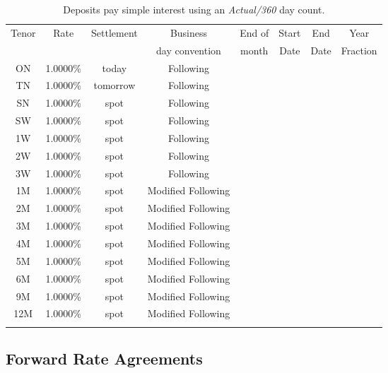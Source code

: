 \documentclass[11pt,reqno]{amsart}
\begin{document}
\begin{table}[tbp]
\label{tab:deposits}
\begin{tabular}{cccccccc}
Tenor & Rate & Settlement & Business       & End of & Start & End  & Year \\
      &      &            & day convention & month   & Date  & Date & Fraction \\
ON & 1.0000\% & today & Following &  &  \\
TN & 1.0000\% & tomorrow & Following &  &  \\
SN & 1.0000\% & spot & Following &  &  \\
SW & 1.0000\% & spot & Following &  &  \\
1W & 1.0000\% & spot & Following &  &  \\
2W & 1.0000\% & spot & Following &  &  \\
3W & 1.0000\% & spot & Following &  &  \\
1M & 1.0000\% & spot & Modified Following &  &  \\
2M & 1.0000\% & spot & Modified Following &  &  \\
3M & 1.0000\% & spot & Modified Following &  &  \\
4M & 1.0000\% & spot & Modified Following &  &  \\
5M & 1.0000\% & spot & Modified Following &  &  \\
6M & 1.0000\% & spot & Modified Following &  &  \\
9M & 1.0000\% & spot & Modified Following &  &  \\
12M & 1.0000\% & spot & Modified Following &  &  \\
&  &  &  &  &
\end{tabular}%
\caption{Deposits pay simple interest using an \emph{Actual/360} day count.}
\end{table}

\subsection{Forward Rate Agreements}
\end{document}
